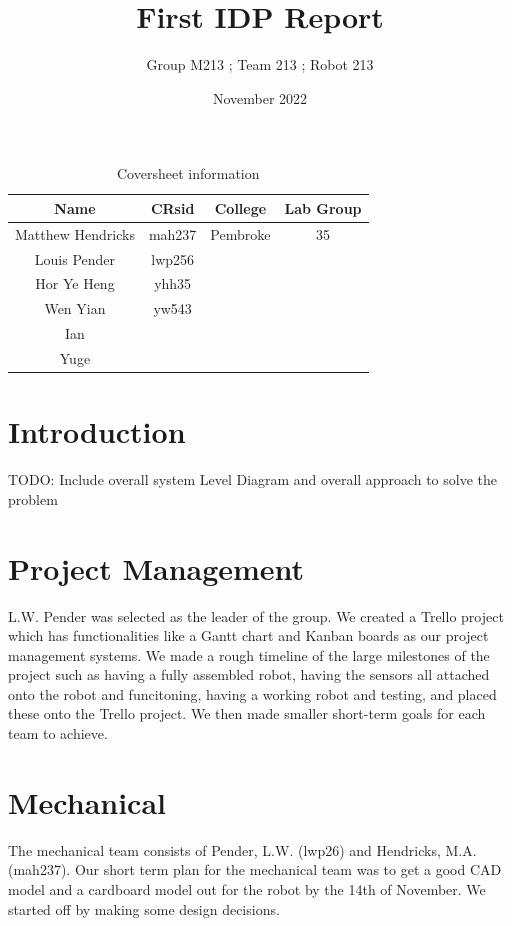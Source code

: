\documentclass{article}
\title{First IDP Report}
\author{Group M213 ; Team 213 ; Robot 213}
\date{November 2022}
\begin{document}
\maketitle


\begin{table}[]
    \centering
    \begin{tabular}{|c|c|c|c|}
        \hline
        Name &  CRsid & College & Lab Group \\
        \hline
        Matthew Hendricks & mah237 & Pembroke & 35 \\
        Louis Pender & lwp256 & & \\
        Hor Ye Heng & yhh35 & & \\
        Wen Yian & yw543 & & \\
        Ian & & & \\
        Yuge & & & \\
        \hline
    \end{tabular}
    \caption{Coversheet information}
    \label{tab:Coversheet}
\end{table}


\newpage

\section{Introduction}
\quad TODO: Include overall system Level Diagram and overall approach to solve the problem


\section{Project Management}
\quad L.W. Pender was selected as the leader of the group. We created a Trello project which has functionalities like a Gantt chart and Kanban boards as our project management systems. We made a rough timeline of the large milestones of the project such as having a fully assembled robot, having the sensors all attached onto the robot and funcitoning, having a working robot and testing, and placed these onto the Trello project. We then made smaller short-term goals for each team to achieve.
    
\section{Mechanical}
\quad The mechanical team consists of Pender, L.W. (lwp26) and Hendricks, M.A. (mah237). Our short term plan for the mechanical team was to get a good CAD model and a cardboard model out for the robot by the 14th of November. We started off by making some design decisions.
\end{document}
